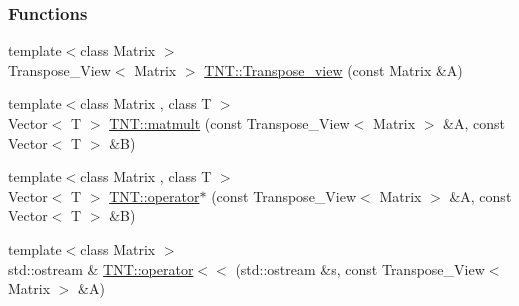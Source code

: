 \subsubsection*{Functions}
\begin{DoxyCompactItemize}
\item 
{\footnotesize template$<$class Matrix $>$ }\\Transpose\_\-View$<$ Matrix $>$ \hyperlink{namespace_t_n_t_a5325ff6dafd079320dad52475593f687}{TNT::Transpose\_\-view} (const Matrix \&A)
\item 
{\footnotesize template$<$class Matrix , class T $>$ }\\Vector$<$ T $>$ \hyperlink{namespace_t_n_t_a5e35a0a5d4507d7dc274fa0399252000}{TNT::matmult} (const Transpose\_\-View$<$ Matrix $>$ \&A, const Vector$<$ T $>$ \&B)
\item 
{\footnotesize template$<$class Matrix , class T $>$ }\\Vector$<$ T $>$ \hyperlink{namespace_t_n_t_aa6782c3fa7e3a339434cc420242f11b1}{TNT::operator$\ast$} (const Transpose\_\-View$<$ Matrix $>$ \&A, const Vector$<$ T $>$ \&B)
\item 
{\footnotesize template$<$class Matrix $>$ }\\std::ostream \& \hyperlink{namespace_t_n_t_a6034dfdd9bbc03b3a635ee630ed7d73e}{TNT::operator$<$$<$} (std::ostream \&s, const Transpose\_\-View$<$ Matrix $>$ \&A)
\end{DoxyCompactItemize}

